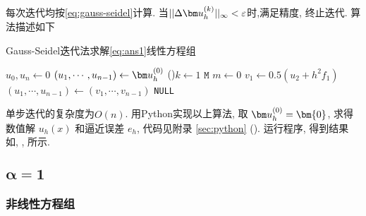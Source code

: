 \documentclass{nedsart}
\begin{document}
每次迭代均按\eqref{eq:gauss-seidel}计算. 当$||\Delta \uh^{(k)}||_\infty < \varepsilon$时,满足精度, 终止迭代. 算法描述如下\\
\begin{algorithm}[H]
    \caption{Gauss-Seidel迭代法求解\eqref{eq:ans1}线性方程组}
    $u_0, u_{n} \leftarrow 0$\;
    $(u_1,\cdots,u_{n-1}) \leftarrow \uh^{(0)}$\;
    \For(){$k \leftarrow 1$ \KwTo $\mathtt{M}$}{
        $m \leftarrow 0$
        $v_1 \leftarrow 0.5(u_{2} + h^2f_1)$\;
        $(u_1,\cdots,u_{n-1}) \leftarrow (v_1,\cdots, v_{n-1})$\;
    }
    \KwRet \texttt{NULL}\;
\end{algorithm}\noindent
单步迭代的复杂度为$O(n)$. 用Python实现以上算法, 取 $\uh^{(0)} = \bm{0}$, 求得数值解 $u_h(x)$ 和逼近误差 $e_h$, 代码见附录 \ref{sec:python} (). 运行程序, 得到结果如, ,  所示.

\subsection[\texorpdfstring{$\alpha = 1$}{alpha=1}]{$\bm{\alpha = 1}$}

\subsubsection{非线性方程组}
\end{document}
